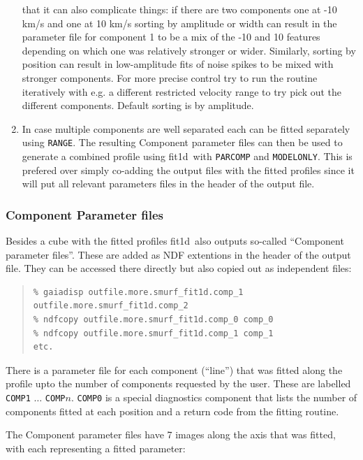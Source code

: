 \documentclass[twoside,11pt]{article}
\newcommand{\xref}[3]{#1}
\renewcommand{\_}{\texttt{\symbol{95}}}
\newenvironment{myquote}{\begin{quote}\begin{small}}{\end{small}\end{quote}}
\newcommand{\task}[1]{\textsf{#1}}
\newcommand{\fitdd}{\xref{\task{fit1d}}{sun258}{FIT1D}}
\newcommand{\cparam}[1]{\texttt{#1}}     %
\newcommand{\ndfcomp}[1]{\texttt{#1}}    %
\begin{document}
\begin{enumerate}
  that it can also complicate things: if there are two components one
  at -10 km/s and one at 10 km/s sorting by amplitude or width can
  result in the parameter file for component 1 to be a mix of the -10
  and 10 features depending on which one was relatively stronger or
  wider. Similarly, sorting by position can result in low-amplitude
  fits of noise spikes to be mixed with stronger components. For more
  precise control try to run the routine iteratively with e.g. a
  different restricted velocity range to try pick out the different
  components. Default sorting is by amplitude.
\item In case multiple components are well separated each can be fitted
separately using \cparam{RANGE}. The resulting Component parameter files
can then be used to generate a combined profile using \fitdd\ with
\cparam{PARCOMP} and \cparam{MODEL\_ONLY}. This is prefered over
simply co-adding the output files with the fitted profiles since it
will put all relevant parameters files in the header of the output
file.
\end{enumerate}

\subsubsection{Component Parameter files}

Besides a cube with the fitted profiles \fitdd\ also outputs so-called
``Component parameter files''. These are added as NDF extentions in
the header of the output file. They can be accessed there directly but
also copied out as independent files:

\begin{myquote}
\begin{verbatim}
% gaiadisp outfile.more.smurf_fit1d.comp_1 outfile.more.smurf_fit1d.comp_2
% ndfcopy outfile.more.smurf_fit1d.comp_0 comp_0
% ndfcopy outfile.more.smurf_fit1d.comp_1 comp_1
etc.
\end{verbatim}
\end{myquote}

There is a parameter file for each component (``line'') that was
fitted along the profile upto the number of components requested by
the user. These are labelled \ndfcomp{COMP\_1} $\ldots$
\texttt{COMP\_$n$}. \texttt{COMP\_0} is a special diagnostics
component that lists the number of components fitted at each position
and a return code from the fitting routine.

The Component parameter files have 7 images along the axis that was
fitted, with each representing a fitted parameter:
\end{document}
